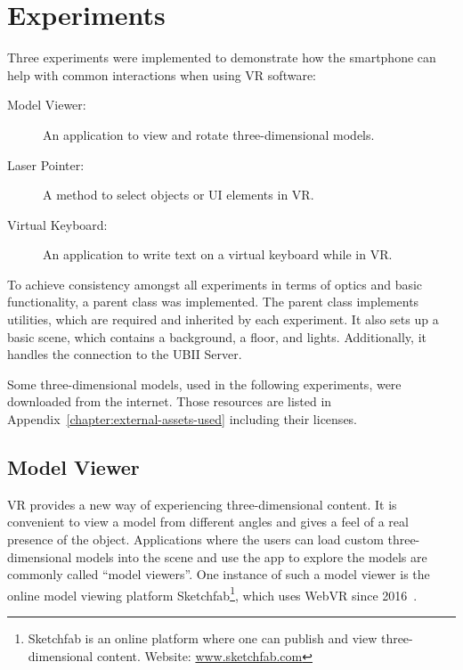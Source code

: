 \chapter{Experiments}\label{chapter:experiments}

Three experiments were implemented to demonstrate how the smartphone can help with common interactions when using \gls{VR} software:

\begin{description}
  \item[Model Viewer:] An application to view and rotate three-dimensional models.
  \item[Laser Pointer:] A method to select objects or \gls{UI} elements in \gls{VR}.
  \item[Virtual Keyboard:] An application to write text on a virtual keyboard while in \gls{VR}.
\end{description}

To achieve consistency amongst all experiments in terms of optics and basic functionality, a parent class was implemented. The parent class implements utilities, which are required and inherited by each experiment. It also sets up a basic scene, which contains a background, a floor, and lights. Additionally, it handles the connection to the \gls{UBII} Server.

Some three-dimensional models, used in the following experiments, were downloaded from the internet. Those resources are listed in Appendix~\ref{chapter:external-assets-used} including their licenses.


\section{Model Viewer}\label{section:model-viewer}

\acrlong{VR} provides a new way of experiencing three-dimensional content. It is convenient to view a model from different angles and gives a feel of a real presence of the object. Applications where the users can load custom three-dimensional models into the scene and use the app to explore the models are commonly called \enquote{model viewers}. One instance of such a model viewer is the online model viewing platform Sketchfab\footnote{Sketchfab is an online platform where one can publish and view three-dimensional content. Website: \href{https://sketchfab.com}{www.sketchfab.com}}, which uses Web\gls{VR} since 2016~\cite{Denoyel.2016}. 

